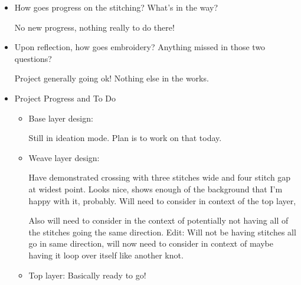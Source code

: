 \documentclass[12pt]{article}
\renewcommand{\,}{\textsuperscript{,}}
\begin{document}
\begin{itemize}
\begin{itemize}
\begin{itemize}
Right now the biggest thing I need to figure out is the base layer gradient.  
I do really want some sort of gradient, and I think that black through cool tones to white through warm tones to black is what I want, but that's not entirely decided for me just yet.  
I'll ideate on that a little, maybe look at some sort of starburst pattern? That could be cute?  
   
 \item How goes progress on the stitching? What's in the way?

No new progress, nothing really to do there!  
   
 \item Upon reflection, how goes embroidery? Anything missed in those two questions?

Project generally going ok! Nothing else in the works.  
   
 \item Project Progress and To Do %
 \begin{itemize}  
 \item Base layer design:  
   
 Still in ideation mode.  
Plan is to work on that today.  
 \item Weave layer design:  
   
Have demonstrated crossing with three stitches wide and four stitch gap at widest point. Looks nice, shows enough of the background that I'm happy with it, probably.  
Will need to consider in context of the top layer,  
   
Also will need to consider in the context of potentially not having all of the stitches going the same direction. Edit: Will not be having stitches all go in same direction, will now need to consider in context of maybe having it loop over itself like another knot.

 \item Top layer: Basically ready to go!  


\end{itemize}
\end{itemize}
\end{itemize}
\end{itemize}
\end{document}

